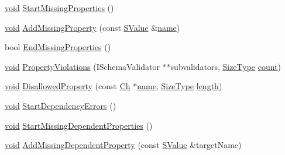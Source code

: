 \begin{DoxyCompactItemize}
\item 
\hyperlink{imgui__impl__opengl3__loader_8h_ac668e7cffd9e2e9cfee428b9b2f34fa7}{void} \hyperlink{classGenericSchemaValidator_a41c4d67e349561f13948a5045bfc50c9}{Start\+Missing\+Properties} ()
\item 
\hyperlink{imgui__impl__opengl3__loader_8h_ac668e7cffd9e2e9cfee428b9b2f34fa7}{void} \hyperlink{classGenericSchemaValidator_a8d355eeb25364e414d9a2f8121aa0eaa}{Add\+Missing\+Property} (const \hyperlink{classGenericSchemaValidator_a3c004e35c7eb9fa5a28c0ccfb8ac62dc}{S\+Value} \&\hyperlink{imgui__impl__opengl3__loader_8h_a5c4947d4516dd7cfa3505ce3a648a4ef}{name})
\item 
bool \hyperlink{classGenericSchemaValidator_a557b7aa531ff94a6355fed8f8575fed5}{End\+Missing\+Properties} ()
\item 
\hyperlink{imgui__impl__opengl3__loader_8h_ac668e7cffd9e2e9cfee428b9b2f34fa7}{void} \hyperlink{classGenericSchemaValidator_a29fa7c6f787450b2df1f9d440436aeab}{Property\+Violations} (I\+Schema\+Validator $\ast$$\ast$subvalidators, \hyperlink{rapidjson_8h_a5ed6e6e67250fadbd041127e6386dcb5}{Size\+Type} \hyperlink{imgui__impl__opengl3__loader_8h_a619bc20e8198de3bd3f3d7fc34de66b2}{count})
\item 
\hyperlink{imgui__impl__opengl3__loader_8h_ac668e7cffd9e2e9cfee428b9b2f34fa7}{void} \hyperlink{classGenericSchemaValidator_a44f06b99edfb650c6088f17e8af5b5a8}{Disallowed\+Property} (const \hyperlink{classGenericSchemaValidator_a8b7dab5a0cda9cc0adaefb4401d260c1}{Ch} $\ast$\hyperlink{imgui__impl__opengl3__loader_8h_a5c4947d4516dd7cfa3505ce3a648a4ef}{name}, \hyperlink{rapidjson_8h_a5ed6e6e67250fadbd041127e6386dcb5}{Size\+Type} \hyperlink{imgui__impl__opengl3__loader_8h_a011fc24f10426c01349e94a4edd4b0d5}{length})
\item 
\hyperlink{imgui__impl__opengl3__loader_8h_ac668e7cffd9e2e9cfee428b9b2f34fa7}{void} \hyperlink{classGenericSchemaValidator_a767f115cc90e0f2f5bdd1c9fbdbf75df}{Start\+Dependency\+Errors} ()
\item 
\hyperlink{imgui__impl__opengl3__loader_8h_ac668e7cffd9e2e9cfee428b9b2f34fa7}{void} \hyperlink{classGenericSchemaValidator_ac4faa073bc4671f42e98a59a9e9cb01a}{Start\+Missing\+Dependent\+Properties} ()
\item 
\hyperlink{imgui__impl__opengl3__loader_8h_ac668e7cffd9e2e9cfee428b9b2f34fa7}{void} \hyperlink{classGenericSchemaValidator_a85f2be483f0ddfc402a97665aff6eca9}{Add\+Missing\+Dependent\+Property} (const \hyperlink{classGenericSchemaValidator_a3c004e35c7eb9fa5a28c0ccfb8ac62dc}{S\+Value} \&target\+Name)
$$
\end{DoxyCompactItemize}
